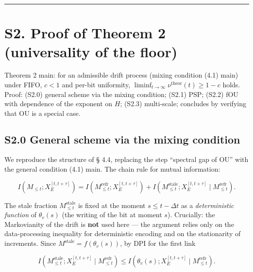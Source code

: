 \documentclass[12pt]{iopart}
\begin{document}
\begin{center}\rule{0.5\linewidth}{0.5pt}\end{center}



\section{S2. Proof of Theorem 2 (universality of the floor)}\label{s2.-proof-of-theorem-2-universality-of-the-floor}



Theorem 2 main: for an admissible drift process (mixing condition (4.1) main) under FIFO, \(c < 1\) and per-bit uniformity, \(\liminf_{t\to\infty}\nu^{\text{theor}}(t) \ge 1-c\) holds. Proof: (S2.0) general scheme via the mixing condition; (S2.1) PSP; (S2.2) fOU with dependence of the exponent on \(H\); (S2.3) multi-scale; concludes by verifying that OU is a special case.



\subsection{S2.0 General scheme via the mixing condition}\label{s2.0-general-scheme-via-the-mixing-condition}



We reproduce the structure of \cite{Andriishin2026b} § 4.4, replacing the step ``spectral gap of OU'' with the general condition (4.1) main. The chain rule for mutual information:



\begin{equation}I(M_{\le t}; X_E^{[t,t+\tau]}) = I(M_{\le t}^{\text{refr}}; X_E^{[t,t+\tau]}) + I(M_{\le t}^{\text{stale}}; X_E^{[t,t+\tau]}\mid M_{\le t}^{\text{refr}}). \tag{S2.1}\end{equation}



The stale fraction \(M_{\le t}^{\text{stale}}\) is fixed at the moment \(s \le t-\Delta t\) as a \emph{deterministic function} of \(\theta_v(s)\) (the writing of the bit at moment \(s\)). Crucially: the Markovianity of the drift is \textbf{not} used here --- the argument relies only on the data-processing inequality for deterministic encoding and on the stationarity of increments. Since \(M^{\text{stale}} = f(\theta_v(s))\), by DPI for the first link



\[I(M_{\le t}^{\text{stale}}; X_E^{[t,t+\tau]}\mid M_{\le t}^{\text{refr}}) \le I(\theta_v(s); X_E^{[t,t+\tau]}\mid M_{\le t}^{\text{refr}}).\]
\end{document}
